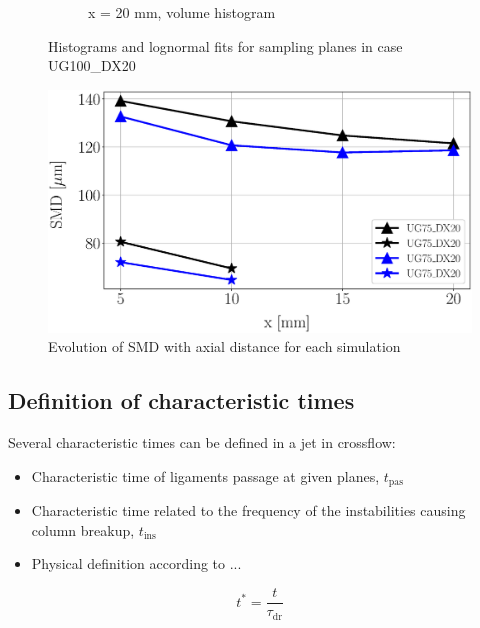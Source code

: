 \begin{figure}[ht]
\begin{subfigure}[b]{0.45\textwidth}
   \caption{x = 20 mm, volume histogram}
\end{subfigure}
\caption{Histograms and lognormal fits for sampling planes in case UG100\_DX20}
\label{fig:JICF_histograms_ug100_dx20}
\end{figure}


\begin{figure}[ht]
\centering
   \includegraphics[scale=0.30]{./part2_developments/figures_ch5_resolved_JICF/SMD_values.eps}
   \caption{Evolution of SMD with axial distance for each simulation}
   \label{}
\end{figure}

\subsection{Definition of characteristic times}

Several characteristic times can be defined in a jet in crossflow:

\begin{itemize}

	\item Characteristic time of ligaments passage at given planes, $t_\mathrm{pas}$
	
	\item Characteristic time related to the frequency of the instabilities causing column breakup, $t_\mathrm{ins}$
	
	\item Physical definition according to ...

\end{itemize}


\begin{equation}
t^* = \frac{t}{\tau_\mathrm{dr}}
\end{equation}

